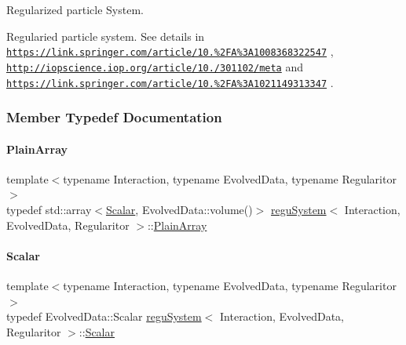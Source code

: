Regularized particle System. 

Regularied particle system. See details in \href{https://link.springer.com/article/10.1023%2FA%3A1008368322547}{\tt https\+://link.\+springer.\+com/article/10.\+1023\%2\+F\+A\%3\+A1008368322547} , \href{http://iopscience.iop.org/article/10.1086/301102/meta}{\tt http\+://iopscience.\+iop.\+org/article/10.\+1086/301102/meta} and \href{https://link.springer.com/article/10.1023%2FA%3A1021149313347}{\tt https\+://link.\+springer.\+com/article/10.\+1023\%2\+F\+A\%3\+A1021149313347} . 

\subsubsection{Member Typedef Documentation}
\mbox{\label{classregu_system_ae2ca73edf865e016a858b694c1d2b49a}} 
\paragraph{\texorpdfstring{Plain\+Array}{PlainArray}}
{\footnotesize\ttfamily template$<$typename Interaction, typename Evolved\+Data, typename Regularitor$>$ \\
typedef std\+::array$<$\mbox{\hyperlink{classregu_system_aca8ee2c387943164ee3ea68370fc3ac0}{Scalar}}, Evolved\+Data\+::volume()$>$ \mbox{\hyperlink{classregu_system}{regu\+System}}$<$ Interaction, Evolved\+Data, Regularitor $>$\+::\mbox{\hyperlink{classregu_system_ae2ca73edf865e016a858b694c1d2b49a}{Plain\+Array}}}

\mbox{\label{classregu_system_aca8ee2c387943164ee3ea68370fc3ac0}} 
\paragraph{\texorpdfstring{Scalar}{Scalar}}
{\footnotesize\ttfamily template$<$typename Interaction, typename Evolved\+Data, typename Regularitor$>$ \\
typedef Evolved\+Data\+::\+Scalar \mbox{\hyperlink{classregu_system}{regu\+System}}$<$ Interaction, Evolved\+Data, Regularitor $>$\+::\mbox{\hyperlink{classregu_system_aca8ee2c387943164ee3ea68370fc3ac0}{Scalar}}}

